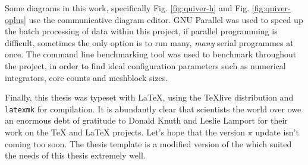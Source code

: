 Some diagrams in this work, specifically Fig. \ref{fig:quiver-h} and Fig. \ref{fig:quiver-oplus} use the  communicative diagram editor.
GNU Parallel \parencite{tange_2021_5523272} was used to speed up the batch processing of data within this project, if parallel programming is difficult, sometimes the only option is to run many, \textit{many} serial programmes at once.
The  command line benchmarking tool was used to benchmark \athena{} throughout the project, in order to find ideal configuration parameters such as numerical integrators, core counts and meshblock sizes.

Finally, this thesis was typeset with \LaTeX{}, using the {\TeX}live distribution and \texttt{latexmk} for compilation.
It is abundantly clear that scientists the world over owe an enormous debt of gratitude to Donald Knuth and Leslie Lamport for their work on the \TeX{} and \LaTeX{} projects.
Let's hope that the version $\pi$ update isn't coming too soon.
The thesis template is a modified version of the  which suited the needs of this thesis extremely well.
